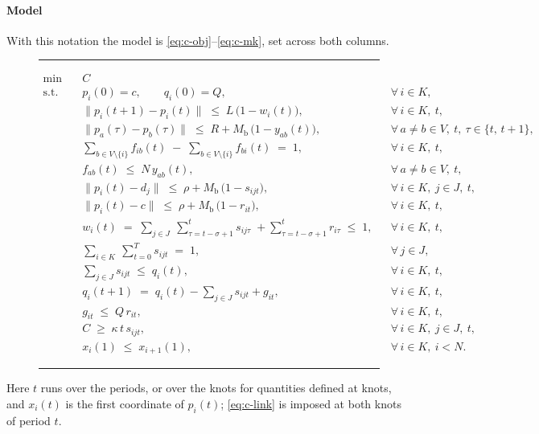 \documentclass[final,5p,times,twocolumn]{elsarticle}
\begin{document}
\paragraph{Model}
With this notation the model is \eqref{eq:c-obj}--\eqref{eq:c-mk}, set across both columns.
\begin{figure}[!t]
\noindent\rule{\textwidth}{0.4pt}\vspace{-6pt}
\begin{align}
\min\quad & C \label{eq:c-obj}\\[3pt]
\text{s.t.}\quad & p_i(0) = c,\qquad q_i(0) = Q,
	&& \forall\, i \in K, \label{eq:c-init}\\[3pt]
& \bigl\|p_i(t+1) - p_i(t)\bigr\| \;\le\; L\,\bigl(1 - w_i(t)\bigr),
	&& \forall\, i \in K,\ t, \label{eq:c-move}\\[3pt]
& \bigl\|p_a(\tau) - p_b(\tau)\bigr\| \;\le\; R + M_{\mathrm{b}}\,\bigl(1 - y_{ab}(t)\bigr),
	&& \forall\, a \ne b \in V,\ t,\ \tau \in \{t,\, t+1\}, \label{eq:c-link}\\[3pt]
& \sum_{b \in V \setminus \{i\}} f_{ib}(t) \;-\; \sum_{b \in V \setminus \{i\}} f_{bi}(t) \;=\; 1,
	&& \forall\, i \in K,\ t, \label{eq:c-cons}\\[3pt]
& f_{ab}(t) \;\le\; N\,y_{ab}(t),
	&& \forall\, a \ne b \in V,\ t, \label{eq:c-flow}\\[3pt]
& \bigl\|p_i(t) - d_j\bigr\| \;\le\; \rho + M_{\mathrm{b}}\,\bigl(1 - s_{ijt}\bigr),
	&& \forall\, i \in K,\ j \in J,\ t, \label{eq:c-serve}\\[3pt]
& \bigl\|p_i(t) - c\bigr\| \;\le\; \rho + M_{\mathrm{b}}\,\bigl(1 - r_{it}\bigr),
	&& \forall\, i \in K,\ t, \label{eq:c-reload}\\[3pt]
& w_i(t) \;=\; \sum_{j \in J}\ \sum_{\tau = t-\sigma+1}^{t} s_{ij\tau} \;+ \sum_{\tau = t-\sigma+1}^{t} r_{i\tau} \;\le\; 1,
	&& \forall\, i \in K,\ t, \label{eq:c-window}\\[3pt]
& \sum_{i \in K}\ \sum_{t = 0}^{T} s_{ijt} \;=\; 1,
	&& \forall\, j \in J, \label{eq:c-once}\\[3pt]
& \sum_{j \in J} s_{ijt} \;\le\; q_i(t),
	&& \forall\, i \in K,\ t, \label{eq:c-cap}\\[3pt]
& q_i(t+1) \;=\; q_i(t) - \sum_{j \in J} s_{ijt} + g_{it},
	&& \forall\, i \in K,\ t, \label{eq:c-cargo}\\[3pt]
& g_{it} \;\le\; Q\,r_{it},
	&& \forall\, i \in K,\ t, \label{eq:c-gcap}\\[3pt]
& C \;\ge\; \kappa\,t\,s_{ijt},
	&& \forall\, i \in K,\ j \in J,\ t, \label{eq:c-mspan}\\[3pt]
& x_i(1) \;\le\; x_{i+1}(1),
	&& \forall\, i \in K,\ i < N. \label{eq:c-mk}
\end{align}
\noindent\rule{\textwidth}{0.4pt}
\end{figure}
Here $t$ runs over the periods, or over the knots for quantities defined at knots, and
$x_i(t)$ is the first coordinate of $p_i(t)$; \eqref{eq:c-link} is imposed at both knots of period $t$.
\end{document}
